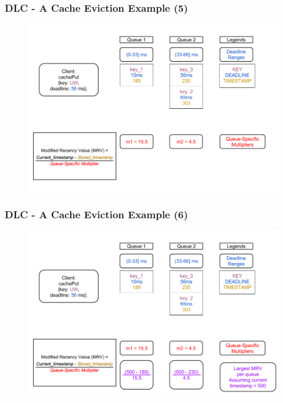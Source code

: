 \documentclass{beamer}
\begin{document}
\begin{frame}
  \frametitle{DLC - A Cache Eviction Example (5)}
  \begin{figure}
    \begin{center}
      \centerline{\includegraphics[scale=0.33]{img/DLC_V5_5.png}}
    \end{center}
  \end{figure}
\end{frame}

\begin{frame}
  \frametitle{DLC - A Cache Eviction Example (6)}
  \begin{figure}
    \begin{center}
      \centerline{\includegraphics[scale=0.33]{img/DLC_V5_6.png}}
    \end{center}
  \end{figure}
\end{frame}
\end{document}
